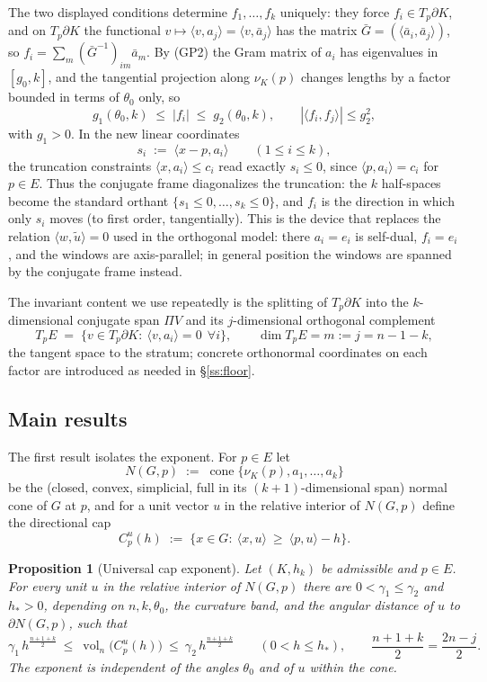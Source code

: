 \documentclass[11pt]{article}
\newtheorem{proposition}[theorem]{Proposition}
\theoremstyle{definition}
\theoremstyle{remark}
\newcommand{\vol}{\operatorname{vol}}
\newcommand{\cone}{\operatorname{cone}}
\newcommand{\nor}{\nu_K}
\begin{document}
The two displayed conditions determine $f_1,\dots,f_k$ uniquely: they force
$f_i\in T_p\partial K$, and on $T_p\partial K$ the functional
$v\mapsto\langle v,a_j\rangle=\langle v,\bar a_j\rangle$ has the matrix
$\bar G=(\langle\bar a_i,\bar a_j\rangle)$, so $f_i=\sum_m(\bar G^{-1})_{im}
\bar a_m$.  By (GP2) the Gram matrix of $a_i$ has eigenvalues in
$[g_0,k]$, and the tangential projection along $\nor(p)$ changes lengths by a
factor bounded in terms of $\theta_0$ only, so
\begin{equation}\label{eq:fbound}
g_1(\theta_0,k)\;\le\;|f_i|\;\le\;g_2(\theta_0,k),
\qquad
|\langle f_i,f_j\rangle|\le g_2^2 ,
\end{equation}
with $g_1>0$.  In the new linear coordinates
\[
s_i\;:=\;\langle x-p,a_i\rangle\qquad(1\le i\le k),
\]
the truncation constraints $\langle x,a_i\rangle\le c_i$ read exactly
$s_i\le0$, since $\langle p,a_i\rangle=c_i$ for $p\in E$.  Thus the conjugate
frame diagonalizes the truncation: the $k$ half-spaces become the standard
orthant $\{s_1\le0,\dots,s_k\le0\}$, and $f_i$ is the direction in which only
$s_i$ moves (to first order, tangentially).  This is the device that replaces
the relation $\langle w,\tilde u\rangle=0$ used in the orthogonal model: there
$a_i=e_i$ is self-dual, $f_i=e_i$, and the windows are axis-parallel; in
general position the windows are spanned by the conjugate frame instead.

The invariant content we use repeatedly is the splitting of $T_p\partial K$
into the $k$-dimensional conjugate span $\Pi V$ and its $j$-dimensional
orthogonal complement
\[
T_pE\;=\;\{v\in T_p\partial K:\ \langle v,a_i\rangle=0\ \ \forall i\},
\qquad \dim T_pE=m:=j=n-1-k,
\]
the tangent space to the stratum; concrete orthonormal coordinates on each
factor are introduced as needed in \S\ref{ss:floor}.

\subsection{Main results}

The first result isolates the exponent.  For $p\in E$ let
\[
N(G,p)\;:=\;\cone\{\nor(p),a_1,\dots,a_k\}
\]
be the (closed, convex, simplicial, full in its $(k+1)$-dimensional span)
normal cone of $G$ at $p$, and for a unit vector $u$ in the relative interior
of $N(G,p)$ define the directional cap
\[
C_p^u(h)\;:=\;\{x\in G:\ \langle x,u\rangle\ \ge\ \langle p,u\rangle-h\}.
\]

\begin{proposition}[Universal cap exponent]\label{prop:exp}
Let $(K,h_k)$ be admissible and $p\in E$.  For every unit $u$ in the relative
interior of $N(G,p)$ there are $0<\gamma_1\le\gamma_2$ and $h_*>0$, depending
on $n,k,\theta_0$, the curvature band, and the angular distance of $u$ to
$\partial N(G,p)$, such that
\[
\gamma_1\,h^{\frac{n+1+k}2}\ \le\ \vol_n\!\bigl(C_p^u(h)\bigr)\ \le\
\gamma_2\,h^{\frac{n+1+k}2}
\qquad(0<h\le h_*),
\qquad \frac{n+1+k}2=\frac{2n-j}2 .
\]
The exponent is independent of the angles $\theta_0$ and of $u$ within the
cone.
\end{proposition}
\end{document}
